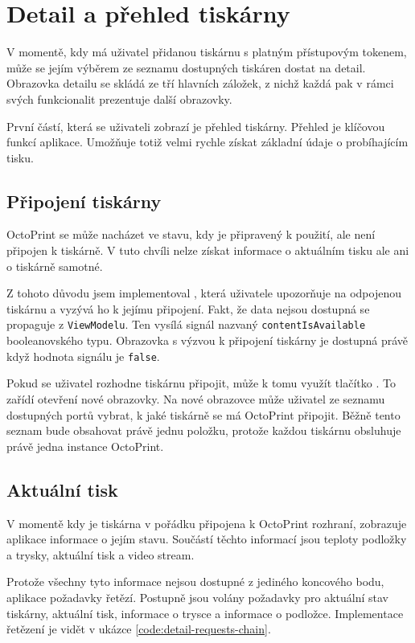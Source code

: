 \section{Detail a přehled tiskárny}

V momentě, kdy má uživatel přidanou tiskárnu s platným přístupovým tokenem, může se jejím výběrem ze seznamu dostupných tiskáren dostat na detail.
Obrazovka detailu se skládá ze tří hlavních záložek, z nichž každá pak v rámci svých funkcionalit prezentuje další obrazovky.

První částí, která se uživateli zobrazí je přehled tiskárny.
Přehled je klíčovou funkcí aplikace.
Umožňuje totiž velmi rychle získat základní údaje o probíhajícím tisku.

\subsection{Připojení tiskárny}

OctoPrint se může nacházet ve stavu, kdy je připravený k použití, ale není připojen k tiskárně.
V tuto chvíli nelze získat informace o aktuálním tisku ale ani o tiskárně samotné.

Z tohoto důvodu jsem implementoval , která uživatele upozorňuje na odpojenou tiskárnu a vyzývá ho k jejímu připojení.
Fakt, že data nejsou dostupná se propaguje z \texttt{ViewModelu}.
Ten vysílá signál nazvaný \texttt{contentIsAvailable} booleanovského typu.
Obrazovka s výzvou k připojení tiskárny je dostupná právě když hodnota signálu je \texttt{false}.

Pokud se uživatel rozhodne tiskárnu připojit, může k tomu využít tlačítko .
To zařídí otevření nové obrazovky.
Na nové obrazovce může uživatel ze seznamu dostupných portů vybrat, k jaké tiskárně se má OctoPrint připojit.
Běžně tento seznam bude obsahovat právě jednu položku, protože každou tiskárnu obsluhuje právě jedna instance OctoPrint.

\subsection{Aktuální tisk}\label{detail-tiskarny-aktualni-tisk}

V momentě kdy je tiskárna v pořádku připojena k OctoPrint rozhraní, zobrazuje aplikace informace o jejím stavu.
Součástí těchto informací jsou teploty podložky a trysky, aktuální tisk a video stream.

Protože všechny tyto informace nejsou dostupné z jediného koncového bodu, aplikace požadavky řetězí.
Postupně jsou volány požadavky pro aktuální stav tiskárny, aktuální tisk, informace o trysce a informace o podložce.
Implementace řetězení je vidět v ukázce \ref{code:detail-requests-chain}.

